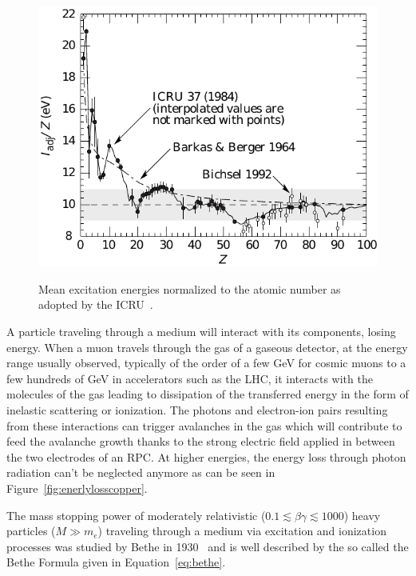 	\begin{figure}
		\centering
		\includegraphics[width = \linewidth]{fig/chapt3/Iadj_pegs_adndt.pdf}\\
		\caption{\label{fig:excitationenergy} Mean excitation energies normalized to the atomic number as adopted by the ICRU~\cite{ICRU37,ICRU49,PDG2018}.}
	\end{figure}
	
	A particle traveling through a medium will interact with its components, losing energy. When a muon travels through the gas of a gaseous detector, at the energy range usually observed, typically of the order of a few \si{GeV} for cosmic muons\cite{PDG2018} to a few hundreds of \si{GeV} in accelerators such as the LHC, it interacts with the molecules of the gas leading to dissipation of the transferred energy in the form of inelastic scattering or ionization. The photons and electron-ion pairs resulting from these interactions can trigger avalanches in the gas which will contribute to feed the avalanche growth thanks to the strong electric field applied in between the two electrodes of an RPC. At higher energies, the energy loss through photon radiation can't be neglected anymore as can be seen in Figure~\ref{fig:enerlylosscopper}.
	
	The mass stopping power of moderately relativistic ($0.1 \lesssim \beta\gamma \lesssim 1000$) heavy particles ($M \gg m_e$) traveling through a medium via excitation and ionization processes was studied by Bethe in 1930~\cite{BETHE1930} and is well described by the so called the Bethe Formula given in Equation~\ref{eq:bethe}.
	
